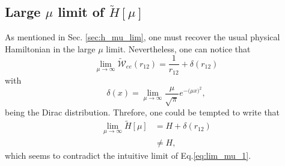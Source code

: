 \documentclass[aip,jcp,reprint,noshowkeys,superscriptaddress]{revtex4-1}
\begin{document}
\subsection{Large $\mu$ limit of $\tilde{H}[\mu]$}
\label{sec:large_mu_lim}
As mentioned in Sec. \ref{sec:h_mu_lim}, one must recover the usual physical Hamiltonian in the large $\mu$ limit. 
Nevertheless, one can notice that 
\begin{equation}
 \label{eq:lim_mu_3}
 \lim_{\mu \rightarrow \infty} \tilde{\mathcal{W}}_{ee}(r_{12})  = \frac{1}{r_{12}} + \delta(r_{12}) 
\end{equation}
with 
\begin{equation}
 \delta(x) = \lim_{\mu \rightarrow \infty} \frac{\mu}{\sqrt{\pi}} e^{-\big(\mu x \big)^2}, 
\end{equation}
being the Dirac distribution. Threfore, one could be tempted to write that 
\begin{equation}
 \begin{aligned}
 \label{eq:lim_mu_4}
 \lim_{\mu \rightarrow \infty} \tilde{H}[\mu]& = H + \delta(r_{12})  \\
                                             & \ne H,
 \end{aligned}
\end{equation}
which seems to contradict the intuitive limit of Eq.\eqref{eq:lim_mu_1}. 
\end{document}
